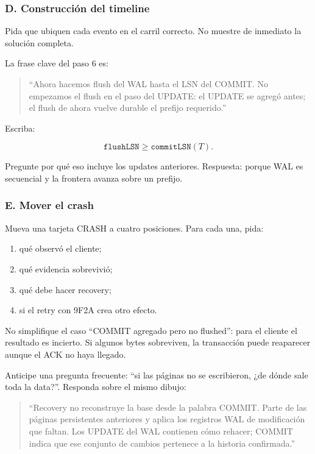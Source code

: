 \documentclass[variant=docente,cover=institutional,mode=screen]{ua-engineering-v6-article}
\begin{document}
\subsubsection*{D. Construcción del timeline}

Pida que ubiquen cada evento en el carril correcto. No muestre de inmediato la solución completa.

La frase clave del paso 6 es:

\begin{quote}
``Ahora hacemos flush del WAL hasta el LSN del COMMIT. No empezamos el flush en el paso del UPDATE: el UPDATE se agregó antes; el flush de ahora vuelve durable el prefijo requerido.''
\end{quote}

Escriba:

\[
\texttt{flushLSN} \geq \texttt{commitLSN}(T).
\]

Pregunte por qué eso incluye los updates anteriores. Respuesta: porque WAL es secuencial y la frontera avanza sobre un prefijo.

\subsubsection*{E. Mover el crash}

Mueva una tarjeta CRASH a cuatro posiciones. Para cada una, pida:

\begin{enumerate}
\item qué observó el cliente;
\item qué evidencia sobrevivió;
\item qué debe hacer recovery;
\item si el retry con 9F2A crea otro efecto.
\end{enumerate}

No simplifique el caso ``COMMIT agregado pero no flushed'': para el cliente el resultado es incierto. Si algunos bytes sobreviven, la transacción puede reaparecer aunque el ACK no haya llegado.

Anticipe una pregunta frecuente: ``si las páginas no se escribieron, ¿de dónde sale toda la data?''. Responda sobre el mismo dibujo:

\begin{quote}
``Recovery no reconstruye la base desde la palabra COMMIT. Parte de las páginas persistentes anteriores y aplica los registros WAL de modificación que faltan. Los UPDATE del WAL contienen cómo rehacer; COMMIT indica que ese conjunto de cambios pertenece a la historia confirmada.''
\end{quote}
\end{document}
